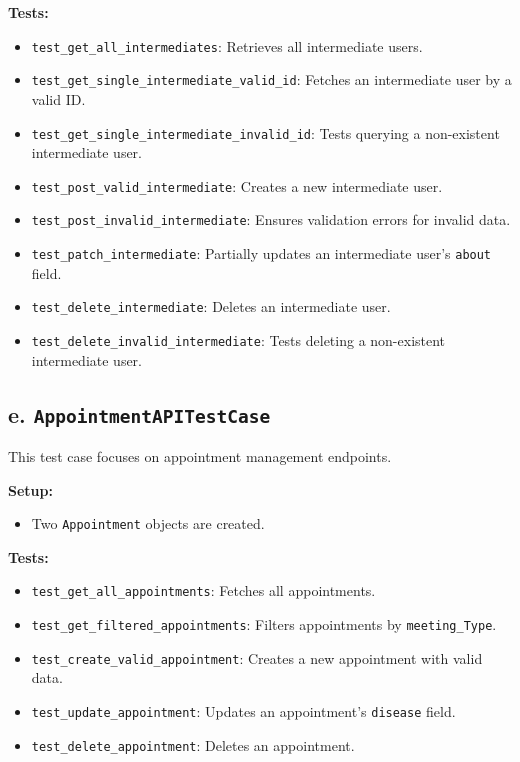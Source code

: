 \documentclass[12pt]{article}
\begin{document}
\textbf{Tests:}
\begin{itemize}
    \item \texttt{test\_get\_all\_intermediates}: Retrieves all intermediate users.
    \item \texttt{test\_get\_single\_intermediate\_valid\_id}: Fetches an intermediate user by a valid ID.
    \item \texttt{test\_get\_single\_intermediate\_invalid\_id}: Tests querying a non-existent intermediate user.
    \item \texttt{test\_post\_valid\_intermediate}: Creates a new intermediate user.
    \item \texttt{test\_post\_invalid\_intermediate}: Ensures validation errors for invalid data.
    \item \texttt{test\_patch\_intermediate}: Partially updates an intermediate user's \texttt{about} field.
    \item \texttt{test\_delete\_intermediate}: Deletes an intermediate user.
    \item \texttt{test\_delete\_invalid\_intermediate}: Tests deleting a non-existent intermediate user.
\end{itemize}

\subsection*{e. \texttt{AppointmentAPITestCase}}
This test case focuses on appointment management endpoints.

\textbf{Setup:}
\begin{itemize}
    \item Two \texttt{Appointment} objects are created.
\end{itemize}

\textbf{Tests:}
\begin{itemize}
    \item \texttt{test\_get\_all\_appointments}: Fetches all appointments.
    \item \texttt{test\_get\_filtered\_appointments}: Filters appointments by \texttt{meeting\_Type}.
    \item \texttt{test\_create\_valid\_appointment}: Creates a new appointment with valid data.
    \item \texttt{test\_update\_appointment}: Updates an appointment's \texttt{disease} field.
    \item \texttt{test\_delete\_appointment}: Deletes an appointment.
\end{itemize}
\end{document}
